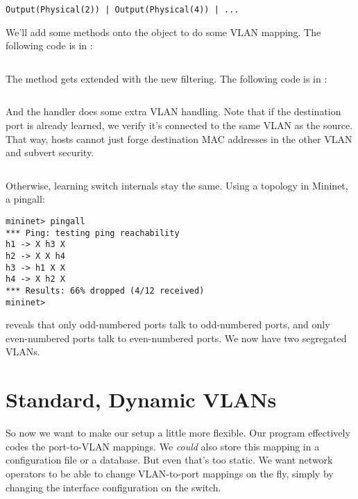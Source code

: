 \begin{verbatim}
Output(Physical(2)) | Output(Physical(4)) | ...
\end{verbatim}

We'll add some methods onto the  object to do some VLAN mapping.  The following
code is in :

\inputminted[firstline=60]{python}{code/handling_vlans/network_information_base_static.py}

The  method gets extended with the new filtering.  
The following
code is in :

\inputminted[firstline=23,lastline=30]{python}{code/handling_vlans/vlan1.py}

And the  handler does some extra VLAN handling.  Note that if the destination port is already
learned, we verify it's connected to the same VLAN as the source.  That way, hosts cannot just forge 
destination MAC addresses in the other VLAN and subvert security.  

\inputminted[firstline=43,lastline=73]{python}{code/handling_vlans/vlan1.py}

Otherwise, learning switch internals stay the same.  Using a  topology in Mininet,
a pingall:

\begin{verbatim}
mininet> pingall
*** Ping: testing ping reachability
h1 -> X h3 X
h2 -> X X h4
h3 -> h1 X X
h4 -> X h2 X
*** Results: 66% dropped (4/12 received)
mininet>
\end{verbatim}

reveals that only odd-numbered ports talk to odd-numbered ports, and only even-numbered ports talk to
even-numbered ports.  We now have two segregated VLANs.

\section{Standard, Dynamic VLANs}

So now we want to make our setup a little more flexible.  Our program effectively codes the port-to-VLAN
mappings.  We \emph{could} also store this mapping in a configuration file or a database.  But even that's
too static.  We want network operators to be able to change VLAN-to-port mappings on the fly, simply
by changing the interface configuration on the switch.

